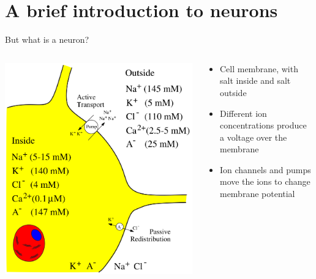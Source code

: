 \documentclass[presentation]{beamer}
\begin{document}
\section{A brief introduction to neurons}
\label{sec:org59e7f87}
\begin{frame}[label={sec:org050a2fd}]{But what is a neuron?}
\begin{columns}
\begin{column}{0.4\columnwidth}
\begin{center}
\includegraphics[width=.9\linewidth]{./neuron_diagram.png}
\end{center}    
\end{column}

\begin{column}{0.6\columnwidth}
\begin{itemize}
\item Cell membrane, with salt inside and salt outside
\item Different ion concentrations produce a voltage over the membrane
\item Ion channels and pumps move the ions to change membrane potential
\end{itemize}
\end{column}
\end{columns}
\end{frame}
\end{document}
